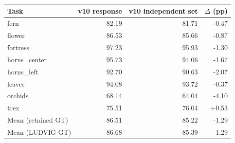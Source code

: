 \begin{tabular}{lrrr}
\toprule
Task & v10 response & v10 independent set & $\Delta$ (pp) \\
\midrule
fern & 82.19 & 81.71 & -0.47 \\
flower & 86.53 & 85.66 & -0.87 \\
fortress & 97.23 & 95.93 & -1.30 \\
horns\_center & 95.73 & 94.06 & -1.67 \\
horns\_left & 92.70 & 90.63 & -2.07 \\
leaves & 94.08 & 93.72 & -0.37 \\
orchids & 68.14 & 64.04 & -4.10 \\
trex & 75.51 & 76.04 & +0.53 \\
\midrule Mean (retained GT) & 86.51 & 85.22 & -1.29 \\
\midrule Mean (LUDVIG GT) & 86.68 & 85.39 & -1.29 \\
\bottomrule
\end{tabular}
